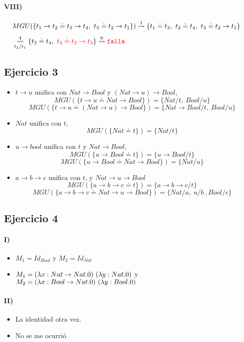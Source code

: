 \documentclass[10pt,a4paper]{article}
\begin{document}
\paragraph{VIII)}
\begin{align*}
&MGU(\{t_1\to t_2\doteq t_3\to t_4, ~t_3\doteq t_2\to t_1\}) \goesTo{1}{} \{t_1\doteq t_3,~ t_2\doteq t_4, ~t_3\doteq t_2\to t_1\} \\
&\goesTo{4}{t_3/t_1} \{t_2\doteq t_4, ~\red{t_3\doteq t_2\to t_3}\} \goesTo{6}{} \falla\\
\end{align*}

\subsection{Ejercicio 3}

\begin{itemize}
\item $t\to u$ unifica con $Nat\to Bool$ y $(Nat\to u)\to Bool$,
    $$MGU(\{t\to u \doteq Nat\to Bool\}) = \{Nat/t,~Bool/u\}$$
    $$MGU(\{t\to u \doteq (Nat\to u)\to Bool\}) = \{Nat\to Bool/t,~Bool/u\}$$
\item $Nat$ unifica con $t$,
    $$MGU(\{Nat \doteq t\}) = \{Nat/t\}$$
\item $u\to bool$ unifica con $t$ y $Nat\to Bool$, 
    $$MGU(\{u\to Bool \doteq t\}) = \{u\to Bool/t\}$$
    $$MGU(\{u\to Bool \doteq Nat\to Bool\}) = \{Nat/u\}$$
\item $a\to b \to c$ unifica con $t$, y $Nat\to u \to Bool$
    $$MGU(\{a\to b \to c \doteq t\}) = \{a\to b \to c/t\}$$
        $$MGU(\{a\to b \to c \doteq Nat\to u \to Bool\}) = \{Nat/a,~u/b~, Bool/c\}$$
\end{itemize}

\subsection{Ejercicio 4}
\paragraph{I)}
\begin{itemize}
    \item $M_1 = Id_{Bool}$ y $M_2 = Id_{Nat}$
    \item $M_1 = (\lambdaAbs{x}{Nat\to Nat}{0})~(\lambdaAbs{y}{Nat}{0})$ y $M_2 = (\lambdaAbs{x}{Bool\to Nat}{0})~(\lambdaAbs{y}{Bool}{0})$
\end{itemize}

\paragraph{II)}
\begin{itemize}
    \item La identidad otra vez.
    \item No se me ocurrió
\end{itemize}
\end{document}
